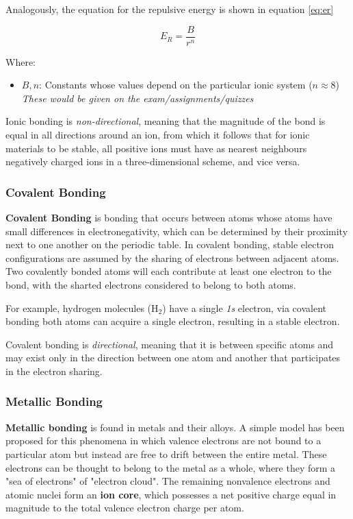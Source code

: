 \documentclass{article}
\begin{document}
Analogously, the equation for the repulsive energy is shown in equation \ref{eq:er}

\begin{equation}\label{eq:er}
    E_R = \frac{B}{r^n}
\end{equation}

Where:

\begin{itemize}
    \item $B,n$: Constants whose values depend on the particular ionic system ($n \approx 8$) \textit{These would be given on the exam/assignments/quizzes}
\end{itemize}

Ionic bonding is \textit{non-directional}, meaning that the magnitude of the bond is equal in all directions around an ion, from which it follows that for ionic materials to be stable, all positive ions must have as nearest neighbours negatively charged ions in a three-dimensional scheme, and vice versa.

\subsubsection{Covalent Bonding}

\textbf{Covalent Bonding} is bonding that occurs between atoms whose atoms have small differences in electronegativity, which can be determined by their proximity next to one another on the periodic table. In covalent bonding, stable electron configurations are assumed by the sharing of electrons between adjacent atoms. Two covalently bonded atoms will each contribute at least one electron to the bond, with the sharted electrons considered to belong to both atoms.

For example, hydrogen molecules ($\text{H}_2$) have a single \textit{1s} electron, via covalent bonding both atoms can acquire a single electron, resulting in a stable electron. 

Covalent bonding is \textit{directional}, meaning that it is between specific atoms and may exist only in the direction between one atom and another that participates in the electron sharing.

\subsubsection{Metallic Bonding}

\textbf{Metallic bonding} is found in metals and their alloys. A simple model has been proposed for this phenomena in which valence electrons are not bound to a particular atom but instead are free to drift between the entire metal. These electrons can be thought to belong to the metal as a whole, where they form a "sea of electrons" of "electron cloud". The remaining nonvalence electrons and atomic nuclei form an \textbf{ion core}, which possesses a net positive charge equal in magnitude to the total valence electron charge per atom. 
\end{document}
